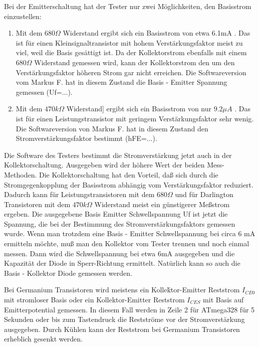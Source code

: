 Bei der Emitterschaltung hat der Tester nur zwei Möglichkeiten, den Basisstrom einzustellen:
\begin{enumerate}
\item Mit dem \(680 \Omega\) Widerstand ergibt sich ein Basisstrom von etwa 6.1mA . Das ist für einen
Kleinsignaltransistor mit hohem Verstärkungsfaktor meist zu viel, weil die Basis gesättigt ist.
Da der Kollektorstrom ebenfalls mit einem \(680 \Omega\) Widerstand gemessen wird, kann der Kollektorstrom
den um den Verstärkungsfaktor höheren Strom gar nicht erreichen. Die Softwareversion vom Markus F. hat
in diesem Zustand die Basis - Emitter Spannung gemessen (Uf=...).\\
\item Mit dem \(470 k\Omega\) Widerstand] ergibt sich ein Basisstrom von nur \(9.2 \mu A\) .
Das ist für einen Leistungstransistor mit geringem Verstärkungsfaktor sehr wenig.
Die Softwareversion von Markus F. hat in diesem Zustand den Stromverstärkungsfaktor bestimmt (hFE=...).\\
\end{enumerate}

Die Software des Testers bestimmt die Stromverstärkung jetzt auch in der Kollektorschaltung.
Ausgegeben wird der höhere Wert der beiden Mess-Methoden.
Die Kollektorschaltung hat den Vorteil, daß sich durch die Stromgegenkopplung der Basisstrom abhängig vom
Verstärkungsfaktor reduziert. Dadurch kann für Leistungstransistoren mit dem \(680 \Omega\) und für Darlington Transistoren
mit dem \(470 k\Omega\) Widerstand meist ein günstigerer Meßstrom ergeben.
Die ausgegebene Basis Emitter Schwellspannung Uf ist jetzt die Spannung,
die bei der Bestimmung des Stromverstärkungsfaktors gemessen wurde.
Wenn man trotzdem eine Basis - Emitter Schwellspannung bei circa 6 mA ermitteln möchte, muß man den Kollektor
vom Tester trennen und noch einmal messen.
Dann wird die Schwellspannung bei etwa 6mA ausgegeben und die Kapazität der Diode in Sperr-Richtung ermittelt.
Natürlich kann so auch die Basis - Kollektor Diode gemessen werden.

Bei Germanium Transistoren wird meistens ein Kolleḱtor-Emitter Reststrom \(I_{CE0}\) mit stromloser Basis oder
ein Kollektor-Emitter Reststrom \(I_{CES}\) mit Basis auf Emitterpotential gemessen.
In diesem Fall werden in Zeile 2 für ATmega328 für 5 Sekunden oder bis zum Tastendruck die Restströme
vor der Stromverstärkung ausgegeben.
Durch Kühlen kann der Reststrom bei Germanium Transistoren erheblich gesenkt werden. 

